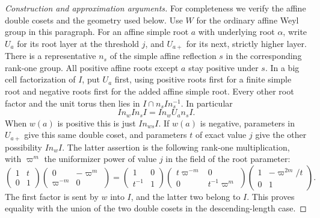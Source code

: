 \documentclass[11pt,a4paper,openany,oneside]{book}
\theoremstyle{resultstyle}
\theoremstyle{definition}
\numberwithin{equation}{chapter}
\begin{document}
\begin{proof}[Construction and approximation arguments]
For completeness we verify the affine double cosets and the
geometry used below. Use \(W\) for the ordinary affine Weyl
group in this paragraph. For an affine simple root \(a\) with
underlying root \(\alpha\), write \(U_a\) for its root layer
at the threshold \(j\), and \(U_{a+}\) for its next, strictly
higher layer. There is a representative \(n_s\) of the simple
affine reflection \(s\) in the corresponding rank-one group.
All positive affine roots except \(a\) stay positive under \(s\).
In a big cell factorization of \(I\), put \(U_a\) first, using
positive roots first for a finite simple root and negative
roots first for the added affine simple root. Every other root
factor and the unit torus then lies in
\(I\cap n_s I n_s^{-1}\). In particular
\[
 I n_w I n_s I=I n_w U_a n_s I .
\]
When \(w(a)\) is positive this is just \(I n_{ws} I\).
If \(w(a)\) is negative, parameters in \(U_{a+}\) give this
same double coset, and parameters \(t\) of exact value \(j\)
give the other possibility \(I n_w I\). The latter assertion
is the following rank-one multiplication, with \(\varpi^m\)
the uniformizer power of value \(j\) in the field of the
root parameter:
\[
 \begin{pmatrix}1&t\\0&1\end{pmatrix}
 \begin{pmatrix}0&-\varpi^m\\\varpi^{-m}&0\end{pmatrix}
 =
 \begin{pmatrix}1&0\\t^{-1}&1\end{pmatrix}
 \begin{pmatrix}t\varpi^{-m}&0\\0&t^{-1}\varpi^m\end{pmatrix}
 \begin{pmatrix}1&-\varpi^{2m}/t\\0&1\end{pmatrix}.
\]
The first factor is sent by \(w\) into \(I\), and the latter
two belong to \(I\). This proves equality with the union of
the two double cosets in the descending-length case.


\end{proof}
\end{document}

